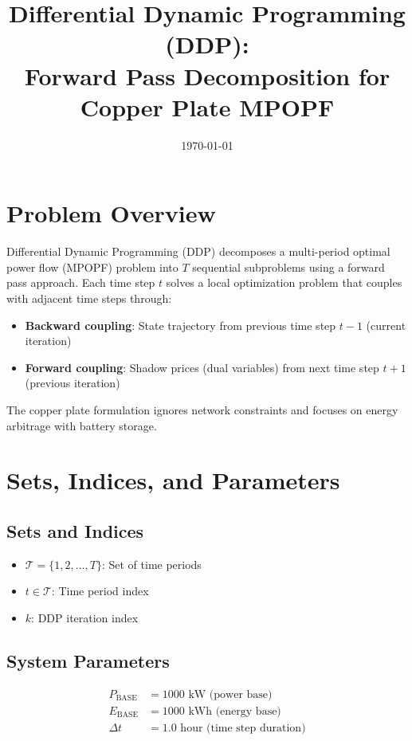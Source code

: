 \documentclass[11pt]{article}
\title{Differential Dynamic Programming (DDP):\\Forward Pass Decomposition for Copper Plate MPOPF}
\author{}
\date{\today}
\begin{document}
\maketitle

\section{Problem Overview}

Differential Dynamic Programming (DDP) decomposes a multi-period optimal power flow (MPOPF) problem into $T$ sequential subproblems using a forward pass approach. Each time step $t$ solves a local optimization problem that couples with adjacent time steps through:
\begin{itemize}
    \item \textbf{Backward coupling}: State trajectory from previous time step $t-1$ (current iteration)
    \item \textbf{Forward coupling}: Shadow prices (dual variables) from next time step $t+1$ (previous iteration)
\end{itemize}

The copper plate formulation ignores network constraints and focuses on energy arbitrage with battery storage.

\section{Sets, Indices, and Parameters}

\subsection{Sets and Indices}
\begin{itemize}
    \item $\mathcal{T} = \{1, 2, \ldots, T\}$: Set of time periods
    \item $t \in \mathcal{T}$: Time period index
    \item $k$: DDP iteration index
\end{itemize}

\subsection{System Parameters}
\begin{align}
P_{\text{BASE}} &= 1000 \text{ kW (power base)} \\
E_{\text{BASE}} &= 1000 \text{ kWh (energy base)} \\
\Delta t &= 1.0 \text{ hour (time step duration)}
\end{align}
\end{document}
